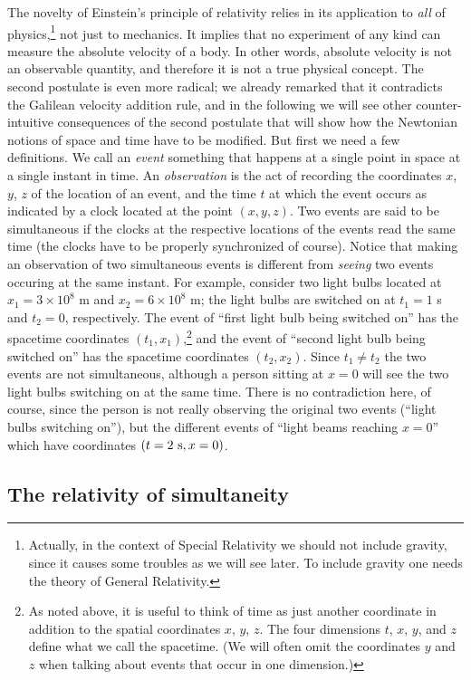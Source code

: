 The novelty of Einstein's principle of relativity relies in its application to {\it all} of physics,\footnote{Actually, in the context of Special Relativity we should not include gravity, since it causes some troubles as we will see later. To include gravity one needs the theory of General Relativity.} not just to mechanics. It implies that no experiment of any kind can measure the absolute velocity of a body. In other words, absolute velocity is not an observable quantity, and therefore it is not a true physical concept. The second postulate is even more radical; we already remarked that it contradicts the Galilean velocity addition rule, and in the following we will see other counter-intuitive consequences of the second postulate that will show how the Newtonian notions of space and time have to be modified. But first we need a few definitions. We call an {\it event} something that happens at a single point in space at a single instant in time. An {\it observation} is the act of recording the coordinates 
$x$, $y$, $z$ of the location of an event, and the time $t$ at which the event occurs as indicated by a clock located at the point $(x,y,z)$. Two events are said to be simultaneous if the clocks at the respective locations of the events read the same time (the clocks have to be properly synchronized of course). Notice that making an observation of two simultaneous events is different from {\it seeing} two events occuring at the same instant. For example, consider two light bulbs located at $x_1=3\times10^8$ m and $x_2=6\times10^8$ m; the light bulbs are switched on at $t_1=1$ s and $t_2=0$, respectively. The event of ``first light bulb being switched on'' has the spacetime coordinates $(t_1,x_1)$,\footnote{As noted above, it is useful to think of time as just another coordinate in addition to the spatial coordinates $x$, $y$, $z$. The four dimensions $t$, $x$, $y$, and $z$ define what we call the spacetime. (We will often omit the coordinates $y$ and $z$ when talking about events that occur in one dimension.)
} and the event of ``second light bulb being switched on'' has the spacetime coordinates $(t_2,x_2)$. Since $t_1\neq t_2$ the two events are not simultaneous, although a person sitting at $x=0$ will see the two light bulbs switching on at the same time. There is no contradiction here, of course, since the person is not really observing the original two events (``light bulbs switching on''), but the different events of ``light beams reaching $x=0$'' which have coordinates $(t=2~{\rm s},x=0)$.

\subsection{The relativity of simultaneity}

